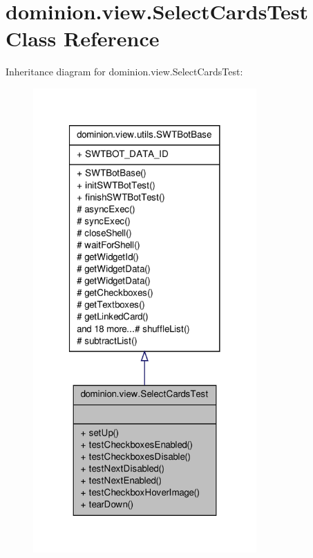 \hypertarget{classdominion_1_1view_1_1SelectCardsTest}{\section{dominion.\-view.\-Select\-Cards\-Test \-Class \-Reference}
\label{classdominion_1_1view_1_1SelectCardsTest}
}


\-Inheritance diagram for dominion.\-view.\-Select\-Cards\-Test\-:
\nopagebreak
\begin{figure}[H]
\begin{center}
\leavevmode
\includegraphics[width=242pt]{classdominion_1_1view_1_1SelectCardsTest__inherit__graph}
\end{center}
\end{figure}


